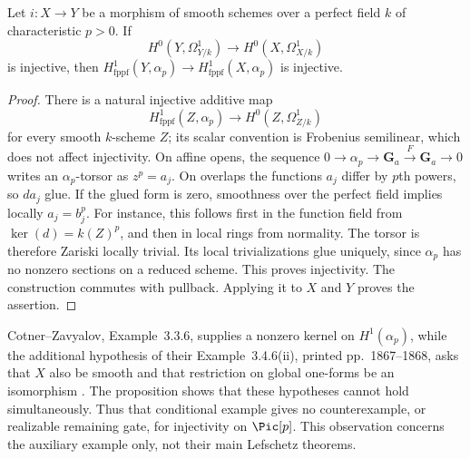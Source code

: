 \begin{proposition}
Let $i:X\to Y$ be a morphism of smooth schemes over a perfect field
$k$ of characteristic $p>0$. If
\[
 H^0(Y,\Omega^1_{Y/k})\longrightarrow H^0(X,\Omega^1_{X/k})
\]
is injective, then
$H^1_{\mathrm{fppf}}(Y,\alpha_p)\to
 H^1_{\mathrm{fppf}}(X,\alpha_p)$ is injective.
\end{proposition}
\begin{proof}
There is a natural injective additive map
\[
 H^1_{\mathrm{fppf}}(Z,\alpha_p)
       \longrightarrow H^0(Z,\Omega^1_{Z/k})
\]
for every smooth $k$-scheme $Z$; its scalar convention is Frobenius
semilinear, which does not affect injectivity. On affine opens,
the sequence $0\to\alpha_p\to\mathbf G_a\xrightarrow{F}\mathbf G_a\to0$
writes an $\alpha_p$-torsor as $z^p=a_j$. On overlaps the functions
$a_j$ differ by $p$th powers, so $da_j$ glue. If the glued form is
zero, smoothness over the perfect field implies locally
$a_j=b_j^p$. For instance, this follows first in the function field
from $\ker(d)=k(Z)^p$, and then in local rings from normality.
The torsor is therefore Zariski locally trivial. Its local
trivializations glue uniquely, since $\alpha_p$ has no nonzero
sections on a reduced scheme. This proves injectivity.
The construction commutes with pullback. Applying it to $X$ and
$Y$ proves the assertion.
\end{proof}

Cotner--Zavyalov, Example~3.3.6, supplies a nonzero kernel on
$H^1(\alpha_p)$, while the additional hypothesis of their
Example~3.4.6(ii), printed pp.~1867--1868, asks that $X$ also be
smooth and that restriction on global one-forms be an isomorphism
\cite{CotnerZavyalov2024}. The proposition shows that these
hypotheses cannot hold simultaneously. Thus that conditional
example gives no counterexample, or realizable remaining gate,
for injectivity on $\Pic[p]$. This observation concerns the
auxiliary example only, not their main Lefschetz theorems.
